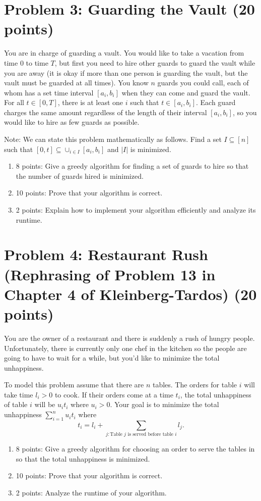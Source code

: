 \documentclass[12pt]{article}
\begin{document}
\section*{Problem 3: Guarding the Vault (20 points)}
You are in charge of guarding a vault. You would like to take a vacation from time $0$ to time $T$, but first you need to hire other guards to guard the vault while you are away (it is okay if more than one person is guarding the vault, but the vault must be guarded at all times). You know $n$ guards you could call, each of whom has a set time interval $[a_i,b_i]$ when they can come and guard the vault. For all $t \in [0,T]$, there is at least one $i$ such that $t \in [a_i,b_i]$. Each guard charges the same amount regardless of the length of their interval $[a_i,b_i]$, so you would like to hire as few guards as possible.

Note: We can state this problem mathematically as follows. Find a set $I \subseteq [n]$ such that $[0,t] \subseteq \cup_{i \in I}{[a_i,b_i]}$ and $|I|$ is minimized.

\begin{enumerate}
\item[(a)] 8 points: Give a greedy algorithm for finding a set of guards to hire so that the number of guards hired is minimized.
\item[(b)] 10 points: Prove that your algorithm is correct.
\item[(c)] 2 points: Explain how to implement your algorithm efficiently and analyze its runtime.
\end{enumerate}
\section*{Problem 4: Restaurant Rush (Rephrasing of Problem 13 in Chapter 4 of Kleinberg-Tardos) (20 points)}
You are the owner of a restaurant and there is suddenly a rush of hungry people. Unfortunately, there is currently only one chef in the kitchen so the people are going to have to wait for a while, but you'd like to minimize the total unhappiness.

To model this problem assume that there are $n$ tables. The orders for table $i$ will take time $l_i > 0$ to cook. If their orders come at a time $t_i$, the total unhappiness of table $i$ will be ${u_i}{t_i}$ where $u_i > 0$. Your goal is to minimize the total unhappiness $\sum_{i=1}^{n}{{u_i}{t_i}}$ where 
\[
t_i = l_i + \sum_{j: \text{Table } j \text{ is served before table } i}{l_j}.
\]
\begin{enumerate}
\item[(a)] 8 points: Give a greedy algorithm for choosing an order to serve the tables in so that the total unhappiness is minimized.
\item[(b)] 10 points: Prove that your algorithm is correct.
\item[(c)] 2 points: Analyze the runtime of your algorithm.
\end{enumerate}
\end{document}
